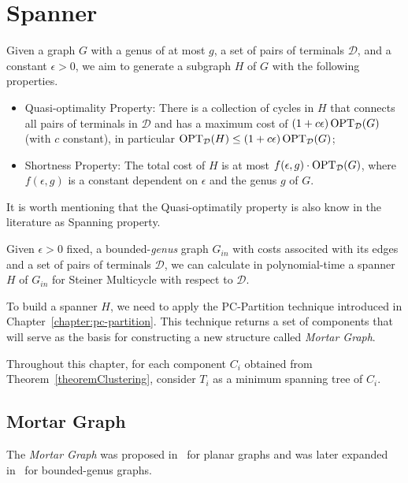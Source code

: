 \chapter{Spanner}
\label{chapter:spanner}

Given a graph \(G\) with a genus of at most \(g\), a set of pairs of terminals \(\mathcal{D}\), and a constant \(\epsilon > 0\), we aim to generate a subgraph \(H\) of \(G\) with the following properties. 

\begin{itemize}
    \item Quasi-optimality Property: There is a collection of cycles in \(H\) that connects all pairs of terminals in \(\mathcal{D}\) and has a maximum cost of \((1 + c \epsilon) \operatorname{\textrm{OPT}}_{\mathcal{D}}(G)\) (with \(c\) constant), in particular \(\operatorname{\textrm{OPT}}_{\mathcal{D}}(H) \leq (1 + c \epsilon) \operatorname{\textrm{OPT}}_{\mathcal{D}}(G)\);
    \item Shortness Property: The total cost of \(H\) is at most \(f(\epsilon, g) \cdot \operatorname{\textrm{OPT}}_{\mathcal{D}}(G)\), where \(f(\epsilon, g)\) is a constant dependent on \(\epsilon\) and the genus \(g\) of \(G\).
\end{itemize}

It is worth mentioning that the Quasi-optimatily property is also know in the literature as Spanning property.

\begin{ftheo}\label{theorem:spanner}
Given \(\epsilon > 0\) fixed, a bounded-\textit{genus} graph \(G_{in}\) with costs associted with its edges and a set of pairs of terminals \(\mathcal{D}\), we can calculate in polynomial-time a spanner \(H\) of \(G_{in}\) for Steiner Multicycle with respect to \(\mathcal{D}\).
\end{ftheo}

To build a spanner \(H\), we need to apply the PC-Partition technique introduced in Chapter~\ref{chapter:pc-partition}. This technique returns a set of components that will serve as the basis for constructing a new structure called \textit{Mortar Graph}.

Throughout this chapter, for each component \(C_i\) obtained from Theorem~\ref{theoremClustering}, consider \(T_i\) as a minimum spanning tree of \(C_i\).

\section{Mortar Graph}

The \textit{Mortar Graph} was proposed in~\cite{Borradaile2009b} for planar graphs and was later expanded in~\cite{Borradaile2012} for bounded-genus graphs.

